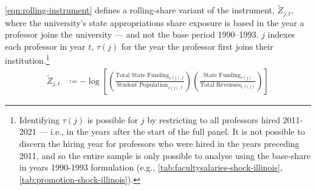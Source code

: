 \autoref{eqn:rolling-instrument} defines a rolling-share variant of the instrument, $\tilde Z_{j,t}$, where the university's state appropriations share exposure is based in the year a professor joins the university --- and not the base period 1990--1993.
$j$ indexes each professor in year $t$, $\tau(j)$ for the year the professor first joins their institution.\footnote{
    Identifying $\tau(j)$ is possible for $j$ by restricting to all professors hired 2011-2021 --- i.e., in the years after the start of the full panel.
    It is not possible to discern the hiring year for professors who  were hired in the years preceding 2011, and so the entire sample is only possible to analyse using the base-share in years 1990-1993 formulation (e.g., \autoref{tab:facultysalaries-shock-illinois}, \ref{tab:promotion-shock-illinois}).
}
\begin{align}
    \label{eqn:rolling-instrument}
    \tilde Z_{j,t} &\coloneqq - \log \left[
    \left( \frac{\text{Total State Funding}_{s(j),t}}{\text{Student Population}_{s(j),t}} \right)
    \left( \frac{\text{State Funding}_{\tau(j)}}{\text{Total Revenues}_{i,\tau(j)}} \right) \right]
\end{align}

